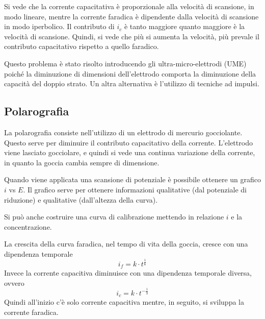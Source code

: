 Si vede che la corrente capacitativa è proporzionale alla velocità di scansione, in modo lineare, mentre la corrente faradica è dipendente dalla velocità di scansione in modo iperbolico.
Il contributo di $i_c$ è tanto maggiore quanto maggiore è la velocità di scansione.
Quindi, si vede che più si aumenta la velocità, più prevale il contributo capacitativo rispetto a quello faradico.

Questo problema è stato risolto introducendo gli ultra-micro-elettrodi (UME) poiché la diminuzione di dimensioni dell'elettrodo comporta la diminuzione della capacità del doppio strato.
Un altra alternativa è l'utilizzo di tecniche ad impulsi.

\subsection{Polarografia}
La polarografia consiste nell'utilizzo di un elettrodo di mercurio gocciolante.
Questo serve per diminuire il contributo capacitativo della corrente. 
L'elettrodo viene lasciato gocciolare, e quindi si vede una continua variazione della corrente, in quanto la goccia cambia sempre di dimensione.


Quando viene applicata una scansione di potenziale è possibile ottenere un grafico $i$ vs $E$.
Il grafico serve per ottenere informazioni qualitative (dal potenziale di riduzione) e qualitative (dall'altezza della curva).


Si può anche costruire una curva di calibrazione mettendo in relazione $i$ e la concentrazione.


La crescita della curva faradica, nel tempo di vita della goccia, cresce con una dipendenza temporale
\[
i_f = k \cdot t^{\frac{1}{6}}
\]
Invece la corrente capacitiva diminuisce con una dipendenza temporale diversa, ovvero
\[
i_c = k \cdot t^{-\frac{1}{3}}
\]
Quindi all'inizio c'è solo corrente capacitiva mentre, in seguito, si sviluppa la corrente faradica.



